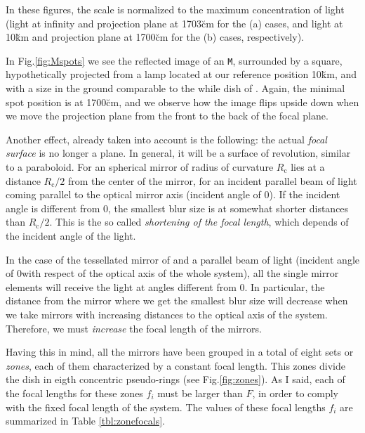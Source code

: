 In these figures, the scale is normalized to the maximum concentration
of light (light at infinity and projection plane at 1703\u{cm} for the
(a) cases, and light at 10\u{km} and projection plane at 1700\u{cm}
for the (b) cases, respectively).

In Fig.\ref{fig:Mspots} we see the reflected image of an \texttt{M},
surrounded by a square, hypothetically projected from a lamp located
at our reference position 10\u{km}, and with a size in the ground
comparable to the while dish of \MAGIC. Again, the minimal spot
position is at 1700\u{cm}, and we observe how the image flips upside
down when we move the projection plane from the front to the back of
the focal plane.

Another effect, already taken into account is the following: the
actual \emph{focal surface} is no longer a plane. In general, it will
be a surface of revolution, similar to a paraboloid. For an spherical
mirror of radius of curvature $R_{\mathrm{c}}$ lies at a distance
$R_{\mathrm{c}}/2$ from the center of the mirror, for an incident
parallel beam of light coming parallel to the optical mirror axis
(incident angle of 0\deg).  If the incident angle is different from
0\deg, the smallest blur size is at somewhat shorter distances than
$R_{\mathrm{c}}/2$. This is the so called \emph{shortening of the
  focal length}, which depends of the incident angle of the light.

In the case of the tessellated mirror of \MAGIC and a parallel beam of
light (incident angle of 0\deg with respect of the optical axis of the
whole system), all the single mirror elements will receive the light
at angles different from 0\deg. In particular, the distance from the
mirror where we get the smallest blur size will decrease when we take
mirrors with increasing distances to the optical axis of the system.
Therefore, we must \emph{increase} the focal length of the mirrors. 

Having this in mind, all the mirrors have been grouped in a total of
eight sets or \emph{zones}, each of them characterized by a constant
focal length. This zones divide the dish in eigth concentric
pseudo-rings (see Fig.\ref{fig:zones}). As I said, each of the
focal lengths for these zones $f_i$ must be larger than $F$, in order
to comply with the fixed focal length of the system. The values of
these focal lengths $f_i$ are summarized in Table
\ref{tbl:zonefocals}.

\zonefocalstbl

\thetaspotsfig

